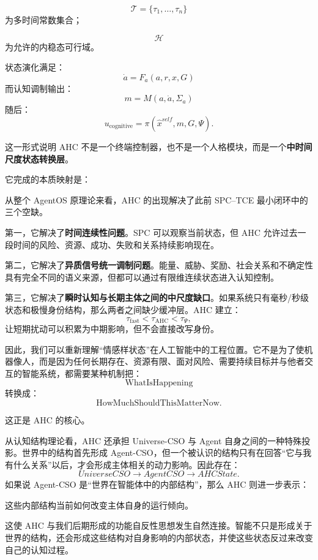 \[
\mathcal T
=
\{\tau_1,\ldots,\tau_n\}
\]
为多时间常数集合；

\[
\mathcal H
\]
为允许的内稳态可行域。

状态演化满足：
\[
\boxed{
\dot a
=
F_a
(
a,
r,
x,
G
)
}
\]
而认知调制输出：
\[
\boxed{
m
=
M(a,\dot a,\Sigma_a)
}
\]
随后：
\[
u_{\mathrm{cognitive}}
=
\pi
(
\hat x^{self},
m,
G,
\Psi
).
\]

这一形式说明 AHC 不是一个终端控制器，也不是一个人格模块，而是一个\textbf{中时间尺度状态转换层}。

它完成的本质映射是：
\begin{statementbox}
\centering
{}
\end{statementbox}

从整个 AgentOS 原理论来看，AHC 的出现解决了此前 SPC--TCE 最小闭环中的三个空缺。

第一，它解决了\textbf{时间连续性问题}。SPC 可以观察当前状态，但 AHC 允许过去一段时间的风险、资源、成功、失败和关系持续影响现在。

第二，它解决了\textbf{异质信号统一调制问题}。能量、威胁、奖励、社会关系和不确定性具有完全不同的语义来源，但都可以通过有限维连续状态进入认知控制。

第三，它解决了\textbf{瞬时认知与长期主体之间的中尺度缺口}。如果系统只有毫秒/秒级状态和极慢身份结构，那么两者之间缺少缓冲层。AHC 建立：
\[
\tau_{\mathrm{fast}}
<
\tau_{\mathrm{AHC}}
<
\tau_{\Psi},
\]
让短期扰动可以积累为中期影响，但不会直接改写身份。

因此，我们可以重新理解“情感样状态”在人工智能中的工程位置。它不是为了使机器像人，而是因为任何长期存在、资源有限、面对风险、需要持续目标并与他者交互的智能系统，都需要某种机制把：
\[
\text{WhatIsHappening}
\]
转换成：
\[
\text{HowMuchShouldThisMatterNow}.
\]

这正是 AHC 的核心。

从认知结构理论看，AHC 还承担 Universe-CSO 与 Agent 自身之间的一种特殊投影。世界中的结构首先形成 Agent-CSO，但一个被认识的结构只有在回答“它与我有什么关系”以后，才会形成主体相关的动力影响。因此存在：
\[
UniverseCSO
\rightarrow
AgentCSO
\rightarrow
AHCState.
\]
如果说 Agent-CSO 是“世界在智能体中的内部结构”，那么 AHC 则进一步表示：
\begin{statementbox}
这些内部结构当前如何改变主体自身的运行倾向。
\end{statementbox}

这使 AHC 与我们后期形成的功能自反性思想发生自然连接。智能不只是形成关于世界的结构，还会形成这些结构对自身影响的内部状态，并使这些状态反过来改变自己的认知过程。

